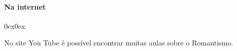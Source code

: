 \documentclass[11pt]{hedrabook}
\begin{document}
\paragraph{Na internet}

\begin{description}0ex\parsep0ex
\newcommand{\tit}[1]{\item[\textnormal{\textsc{\MakeTextLowercase{#1}}}]}
\newcommand{\titidem}{\item[\line(1,0){25}]}

\tit{}\noindent No site You Tube é possível encontrar muitas aulas sobre o Romantismo. 

\end{description}
\end{document}
